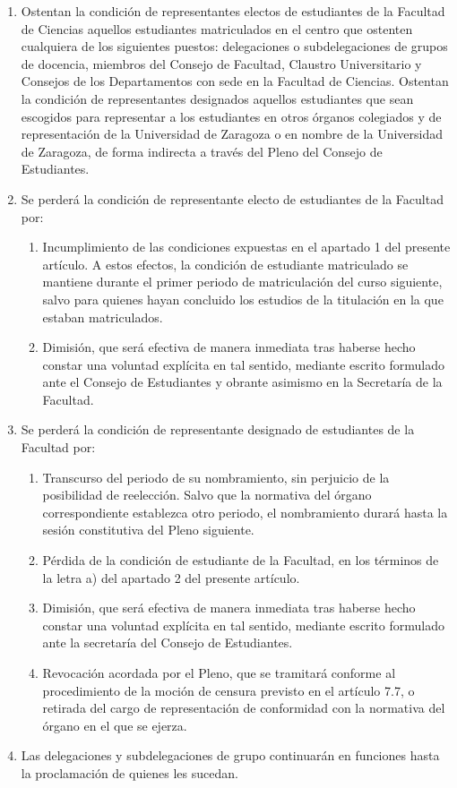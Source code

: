 \documentclass[11pt,a4paper]{article}
\begin{document}
\begin{enumerate}
\item Ostentan la condición de representantes electos de estudiantes de la Facultad de Ciencias aquellos estudiantes matriculados en el centro que ostenten cualquiera de los siguientes puestos: delegaciones o subdelegaciones de grupos de docencia, miembros del Consejo de Facultad, Claustro Universitario y Consejos de los Departamentos con sede en la Facultad de Ciencias. Ostentan la condición de representantes designados aquellos estudiantes que sean escogidos para representar a los estudiantes en otros órganos colegiados y de representación de la Universidad de Zaragoza o en nombre de la Universidad de Zaragoza, de forma indirecta a través del Pleno del Consejo de Estudiantes.
\item Se perderá la condición de representante electo de estudiantes de la Facultad por:
  \begin{enumerate}
    \item Incumplimiento de las condiciones expuestas en el apartado 1 del presente artículo. A estos efectos, la condición de estudiante matriculado se mantiene durante el primer periodo de matriculación del curso siguiente, salvo para quienes hayan concluido los estudios de la titulación en la que estaban matriculados.
    \item Dimisión, que será efectiva de manera inmediata tras haberse hecho constar una voluntad explícita en tal sentido, mediante escrito formulado ante el Consejo de Estudiantes y obrante asimismo en la Secretaría de la Facultad.
  \end{enumerate}
\item Se perderá la condición de representante designado de estudiantes de la Facultad por:
  \begin{enumerate}
    \item Transcurso del periodo de su nombramiento, sin perjuicio de la posibilidad de reelección. Salvo que la normativa del órgano correspondiente establezca otro periodo, el nombramiento durará hasta la sesión constitutiva del Pleno siguiente.
    \item Pérdida de la condición de estudiante de la Facultad, en los términos de la letra a) del apartado 2 del presente artículo.
    \item Dimisión, que será efectiva de manera inmediata tras haberse hecho constar una voluntad explícita en tal sentido, mediante escrito formulado ante la secretaría del Consejo de Estudiantes.
    \item Revocación acordada por el Pleno, que se tramitará conforme al procedimiento de la moción de censura previsto en el artículo 7.7, o retirada del cargo de representación de conformidad con la normativa del órgano en el que se ejerza.
  \end{enumerate}
\item Las delegaciones y subdelegaciones de grupo continuarán en funciones hasta la proclamación de quienes les sucedan.
\end{enumerate}
\end{document}
